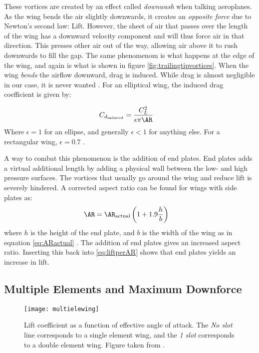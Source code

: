     These vortices are created by an effect called \emph{downwash} when talking aeroplanes. As the wing bends the air slightly downwards, it creates an \emph{opposite force} due to Newton's second law: Lift. However, the sheet of air that passes over the length of the wing has a downward velocity component and will thus force air in that direction. This presses other air out of the way, allowing air above it to rush downwards to fill the gap. The same phenomenom is what happens at the edge of the wing, and again is what is shown in figure \ref{fig:trailingtipvortices}. When the wing \emph{bends} the airflow downward, drag is induced. While drag is almost negligible in our case, it is never wanted \cite{peterkampf}. For an elliptical wing, the induced drag coefficient is given by:

    \begin{align}
      C_{d_\text{induced}} &= \frac{C_L^2}{\epsilon \pi \AR }
    \end{align}
    Where $\epsilon = 1$ for an ellipse, and generally $\epsilon < 1$ for anything else. For a rectangular wing, $\epsilon = 0.7$ \cite{nasainduceddrag}.

    A way to combat this phenomenon is the addition of end plates. End plates adds a virtual additional length by adding a physical wall between the low- and high pressure surfaces. The vortices that usually go around the wing and reduce lift is severely hindered. A corrected aspect ratio can be found for wings with side plates as:
    \begin{align}
      \AR &= \AR_\text{actual}\left(1+1.9\frac{h}{b}\right) \label{eq:endplates}
    \end{align}
    where $h$ is the height of the end plate, and $b$ is the width of the wing as in equation \ref{eq:ARactual} \cite{jkatz}. The addition of end plates gives an increased aspect ratio. Inserting this back into \ref{eq:liftperAR} shows that end plates yields an increase in lift.

    \subsection{Multiple Elements and Maximum Downforce}
      \begin{figure}[ht]
        \texttt{[image: multielewing]}
        \caption{Lift coefficient as a function of effective angle of attack. The \emph{No slot} line corresponds to a single element wing, and the \emph{1 slot} corresponds to a double element wing. Figure taken from \cite{jkatz}.}
        \label{fig:multielewing}
      \end{figure}

